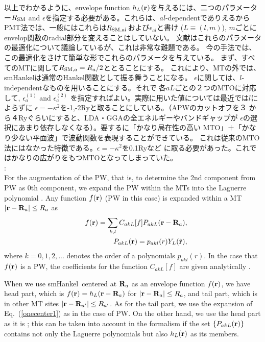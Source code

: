 \documentclass[twocolumn,showpacs,preprintnumbers,amsmath,amssymb,floatfix]{revtex4-1}
\newcommand{\bfr}{{\bf r}}
\newcommand{\hbfr}{\hat{\bf r}}
\newcommand{\bfR}{{\bf R}}
\def\epsilonaone{\epsilon^{(1)}_a}
\def\epsilonatwo{\epsilon^{(2)}_a}
\newcommand{\req}[1]{\mbox{Eq.~\!(\ref{#1})}}
\def\smh{smHankel}
\def\RSM{R_{\rm SM}}
\def\RSMa{R_{{\rm SM},a}}
\def\RSMal{R_{{\rm SM},al}}
\def\pakl{p_{akl}}
\def\PakL{P_{akL}}
\def\CakL{C_{akL}}
\begin{document}
以上でわかるように、envelope
function $h_L(\bfr)$を与えるには、二つのパラメーター$\RSM$ and
$\epsilon$を指定する必要がある。これらは、$al$-dependentでありえるから
PMT法では、一般にはこれらは$\RSMal$および$\epsilon_{al}$と書け
($L\equiv(l,m)$), $m$ごとにenvelop関数のradial部分を変えることはしていない。
文献\cite{lmfchap}はこれらのパラメータの最適化について議論しているが、これは非常な難題である。
今の手法では、この最適化をさけて簡単な形でこれらのパラメータを与えている。
まず、すべてのMTに関して$\RSMa= R_a/2$ととることにする。
これにより、MTの外では、\smh は通常のHankel関数として振る舞うことになる。
$\epsilon$に関しては、$l$-independentなものを用いることにする。それで
各$aL$ごとの２つのMTOに対応して, $\epsilonaone$ and $\epsilonatwo$ 
を指定すればよい。実際に用いた値については最近では$l$によらずに
$\epsilon=-\kappa^2$を-1,-2Ryと取ることにしている。（APWのカットオフを３
から４Ryぐらいにすると、LDA・GGAの全エネルギーやバンドギャップが
$\epsilon$の選択にあまり依存しなくなる）。要するに「かなり局在性の高い
MTO」＋「かなり少ない平面波」で波動関数を表現することができている。
これは従来のMTO法にはなかった特徴である。$\epsilon=-\kappa^2$を0.1Ryなど
に取る必要があった。これではかなりの広がりをもつMTOとなってしまっていた。\\

:\\
For the augmentation of the PW, that is, to determine the 2nd component
from PW as 0th component, we expand the PW within the MTs into the
Laguerre polynomial \cite{pmt1}.  Any function $f(\bfr)$ (PW in this
case) is expanded within a MT $|\bfr-\bfR_a|\leq R_a$ as
\begin{eqnarray}
&&f(\bfr)= \sum_{k,l} \CakL[f] \PakL(\bfr-\bfR_a), \label{onecenter1}\\
&&\PakL(\bfr)=\pakl(r) Y_L(\hbfr) \label{onecenter2},
\end{eqnarray}
where $k=0,1,2,...$ denotes the order of a polynomials $\pakl(r)$.  In
the case that $f(\bfr)$ is a PW, the coefficients for the function
$\CakL[f]$ are given analytically \cite{Bott98}.

When we use \smh\ centered at $\bfR_a$ as an envelope function
$f(\bfr)$, 
we have head part, which is $f(\bfr)=h_L(\bfr-\bfR_a)$ for
$|\bfr-\bfR_a| \leq R_a$, and tail part, which is in other MT
sites $|\bfr-\bfR_{a'}| \leq R_{a'}$.  As for the tail part, we use the
expansion of \req{onecenter1} as in the case of PW. On the other hand, we
use the head part as it is \cite{privatemark1};
this can be taken into account in the formalism 
if the set $\{\PakL(\bfr) \}$ contains not only the Laguerre
polynomials but also $h_L(\bfr)$ as its members.\\
\end{document}

